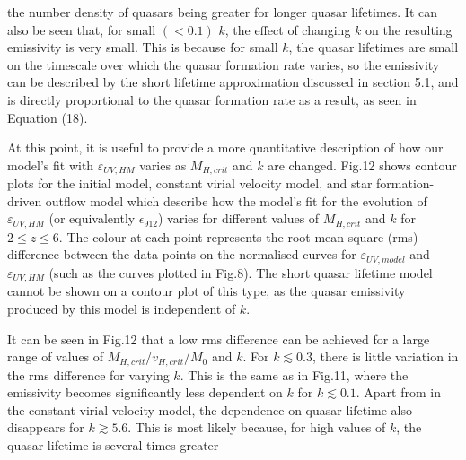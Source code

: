 \documentclass[12pt, twocolumn]{report}%
\begin{document}
\twocolumngrid


\noindent the number density of quasars being greater for longer quasar lifetimes. It can also be seen that, for small $(<0.1)$ $k$, the effect of changing $k$ on the resulting emissivity is very small. This is because for small $k$, the quasar lifetimes are small on the timescale over which the quasar formation rate varies, so the emissivity can be described by the short lifetime approximation discussed in section 5.1, and is directly proportional to the quasar formation rate as a result, as seen in Equation (18).\par

At this point, it is useful to provide a more quantitative description of how our model's fit with $\varepsilon_{UV,HM}$ varies as $M_{H,crit}$ and $k$ are changed. Fig.12 shows contour plots for the initial model, constant virial velocity model, and star formation-driven outflow model which describe how the model's fit for the evolution of $\varepsilon_{UV,HM}$ (or equivalently $\epsilon_{912}$) varies for different values of $M_{H,crit}$ and $k$ for $2\leq z\leq6$. The colour at each point represents the root mean square (rms) difference between the data points on the normalised curves for $\varepsilon_{UV,model}$ and $\varepsilon_{UV,HM}$ (such as the curves plotted in Fig.8). The short quasar lifetime model cannot be shown on a contour plot of this type, as the quasar emissivity produced by this model is independent of $k$.\par

It can be seen in Fig.12 that a low rms difference can be achieved for a large range of values of $M_{H,crit}$/$v_{H,crit}$/$M_0$ and $k$. For $k\lesssim0.3$, there is little variation in the rms difference for varying $k$. This is the same as in Fig.11, where the emissivity becomes significantly less dependent on $k$ for $k\lesssim0.1$. Apart from in the constant virial velocity model, the dependence on quasar lifetime also disappears for $k\gtrsim5.6$. This is most likely because, for high values of $k$, the quasar lifetime is several times greater

\onecolumngrid
\end{document}

